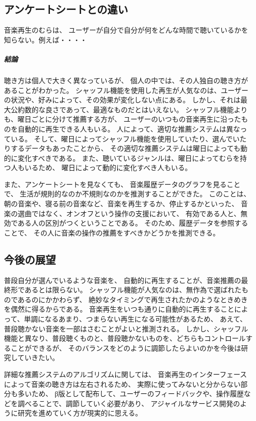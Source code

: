 \documentclass[11pt, twocolumn]{jsarticle}
\begin{document}
\subsection{アンケートシートとの違い}
音楽再生のむらは、
ユーザーが自分で自分が何をどんな時間で聴いているかを知らない。例えば・・・・

\subparagraph{結論}
聴き方は個人で大きく異なっているが、
個人の中では、その人独自の聴き方があることがわかった。
シャッフル機能を使用した再生が人気なのは、ユーザーの状況や、好みによって、その効果が変化しない点にある。
しかし、それは最大公約数的な良さであって、最適なものだとはいえない。
シャッフル機能よりも、曜日ごとに分けて推薦する方が、
ユーザーのいつもの音楽再生に沿ったものを自動的に再生できる人もいる。
人によって、適切な推薦システムは異なっている。
そして、曜日によってシャッフル機能を使用していたり、選んでいたりするデータもあったことから、
その適切な推薦システムは曜日によっても動的に変化すべきである。
また、聴いているジャンルは、曜日によってむらを持つ人もいるため、
曜日によって動的に変化すべき人もいる。

また、アンケートシートを見なくても、
音楽履歴データのグラフを見ることで、
生活が規則的なのか不規則なのかを推測することができた。
このことは、
朝の音楽や、寝る前の音楽など、音楽を再生するか、停止するかといった、
音楽の選曲ではなく、オンオフという操作の支援において、
有効である人と、無効である人の区別がつくということである。
そのため、履歴データを参照することで、
その人に音楽の操作の推薦をすべきかどうかを推測できる。

\subsection{今後の展望}
普段自分が選んでいるような音楽を、
自動的に再生することが、音楽推薦の最終形であるとは限らない。
シャッフル機能が人気なのは、無作為で選ばれたものであるのにかかわらず、
絶妙なタイミングで再生されたかのようなときめきを偶然に得るからである。
音楽再生をいつも通りに自動的に再生することによって、単調になるあまり、つまらない再生になる可能性があるため、
あえて、普段聴かない音楽を一部はさむことがよいと推測される。
しかし、シャッフル機能と異なり、普段聴くものと、普段聴かないものを、どちらもコントロールすることができるが、
そのバランスをどのように調節したらよいのかを今後は研究していきたい。

詳細な推薦システムのアルゴリズムに関しては、
音楽再生のインターフェースによって音楽の聴き方は左右されるため、
実際に使ってみないと分からない部分も多いため、
β版として配布して、ユーザーのフィードバックや、操作履歴などを調べることで、調節していく必要があり、
アジャイルなサービス開発のように研究を進めていく方が現実的に思える。
\end{document}
